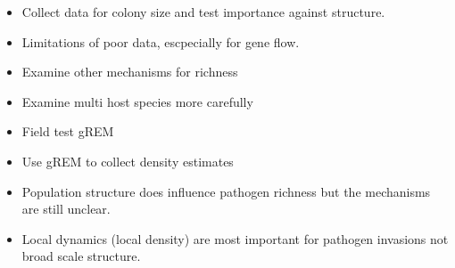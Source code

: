 
\begin{itemize}
\item Collect data for colony size and test importance against structure.
\item Limitations of poor data, escpecially for gene flow.
\item Examine other mechanisms for richness
\item Examine multi host species more carefully
\item Field test gREM
\item Use gREM to collect density estimates 
\end{itemize}



\begin{itemize}
\item Population structure does influence pathogen richness but the mechanisms are still unclear.
\item Local dynamics (local density) are most important for pathogen invasions not broad scale structure.
\end{itemize}





